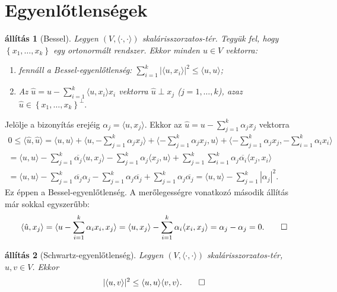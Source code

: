 \documentclass[a4paper, showtrims]{memoir}
\makeatletter
\renewenvironment{proof}[1][\proofname]
    {\par\pushQED{\qed}%
    \normalfont \topsep6\p@\@plus6\p@\relax
    \trivlist
    \item[\hskip\labelsep
        \itshape
    #1\@addpunct{:}]\ignorespaces}
    {\popQED\endtrivlist\@endpefalse}
\theoremstyle{plain}
\newtheorem{proposition}{állítás}[chapter]
\theoremstyle{remark}
\theoremstyle{definition}
\DeclareMathOperator{\lin}{lin}
\newcommand{\ip}[2]{\langle#1,#2\rangle}
\makeatother
\begin{document}
\section{Egyenlőtlenségek}
\begin{proposition}[Bessel]\label{pr:Bessel}
	Legyen $\left( V,\ip{\cdot}{\cdot} \right)$ skalárisszorzatos-tér.
	Tegyük fel, hogy $\left\{ x_1,\ldots,x_k \right\}$ egy ortonormált rendszer.
	Ekkor minden $u\in V$ vektorra:
	\begin{enumerate}
		\item
		      fennáll a  \emph{Bessel-egyenlőtlenség:}
		      $\sum_{i=1}^k|\ip{u}{x_i}|^2\leq\ip{u}{u}$;
		\item
		      Az
		      \(
		      \hat{u}=u-\sum_{i=1}^k\ip{u}{x_i}x_i
		      \)
		      vektorra $\hat{u}\perp x_j$
		      ($j=1,\ldots,k$), azaz
		      \(
		      \hat{u}\in
		      \left\{ x_1,\ldots,x_k \right\}^\perp
		      .
		      \)
		      \qedhere
	\end{enumerate}
\end{proposition}
\begin{proof}
	Jelölje a bizonyítás erejéig
	\begin{math}
		\alpha_j=\ip{u}{x_j}.
	\end{math}
	Ekkor az $\hat{u}=u-\sum_{j=1}^k\alpha_jx_j$ vektorra
	\begin{multline*}
		0
		\leq
		\ip{\hat{u}}{\hat{u}}
		=
		\ip{u}{u}+\ip{u}{-\sum_{j=1}^k\alpha_jx_j}+\ip{-\sum_{j=1}^k\alpha_jx_j}{u}+\ip{-\sum_{j=1}^k\alpha_jx_j}{-\sum_{i=1}^k\alpha_ix_i}
		\\
		=
		\ip{u}{u}-\sum_{j=1}^k\overline{\alpha_j}\ip{u}{x_j}-\sum_{j=1}^k\alpha_j\ip{x_j}{u}+\sum_{j=1}^k\sum_{i=1}^k\alpha_j\overline{\alpha_i}\ip{x_j}{x_i}
		\\
		=
		\ip{u}{u}-\sum_{j=1}^k\overline{\alpha_j}\alpha_j-\sum_{j=1}^k\alpha_j\overline{\alpha_j}+\sum_{j=1}^k\alpha_j\overline{\alpha_j}
		=\ip{u}{u}-\sum_{j=1}^k|\alpha_j|^2.
	\end{multline*}
	Ez éppen a Bessel-egyenlőtlenség.
	A merőlegességre vonatkozó második állítás már sokkal egyszerűbb:
	\[
		\ip{\hat{u}}{x_j}
		=
		\ip{u-\sum_{i=1}^k\alpha_ix_i}{x_j}
		=
		\ip{u}{x_j}-\sum_{i=1}^k\alpha_i\ip{x_i}{x_j}
		=
		\alpha_j-\alpha_j
		=
		0.
		\qedhere
	\]
\end{proof}
\begin{proposition}[Schwartz-egyenlőtlenség]\label{pr:Schwartz-egyenlőtlenség}
	Legyen $\left( V,\ip{\cdot}{\cdot} \right)$ skalárisszorzatos-tér,
	$u,v\in V$.
	Ekkor
	\[
		|\ip{u}{v}|^2\leq \ip{u}{u}\ip{v}{v}.\qedhere
	\]
\end{proposition}
\end{document}
